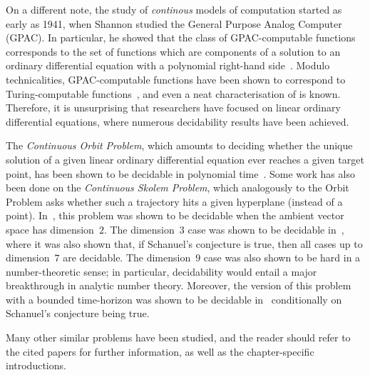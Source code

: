 On a different note, the study of \emph{continous} models of computation started as early as 1941, when Shannon studied the General Purpose Analog Computer (GPAC).
In particular, he showed that the class of GPAC-computable functions corresponds to the set of functions which are components of a solution to an ordinary differential equation with a polynomial right-hand side~\cite{Shannon1941}.
Modulo technicalities, GPAC-computable functions have been shown to correspond to Turing-computable functions~\cite{Bournez1,Bournez2}, and even a neat characterisation of \PTIME{} is known.
Therefore, it is unsurprising that researchers have focused on linear ordinary differential equations, where numerous decidability results have been achieved.

The \emph{Continuous Orbit Problem}, which amounts to deciding whether the unique solution of a given linear ordinary differential equation ever reaches a given target point, has been shown to be decidable in polynomial time~\cite{Hainry08,ContinuousOrbitIPL}.
Some work has also been done on the \emph{Continuous Skolem Problem}, which analogously to the Orbit Problem asks whether such a trajectory hits a given hyperplane (instead of a point).
In~\cite{ContinuousSkolem}, this problem was shown to be decidable when the ambient vector space has dimension~$2$. The dimension~$3$ case was shown to be decidable in~\cite{VCthesis}, where it was also shown that, if Schanuel's conjecture is true, then all cases up to dimension~$7$ are decidable. The dimension~$9$ case was also shown to be hard in a number-theoretic sense; in particular, decidability would entail a major breakthrough in analytic number theory.
Moreover, the version of this problem with a bounded time-horizon was shown to be decidable in~\cite{ContinuousSkolem3} conditionally on Schanuel's conjecture being true.

Many other similar problems have been studied, and the reader should refer to the cited papers for further information, as well as the chapter-specific introductions.
